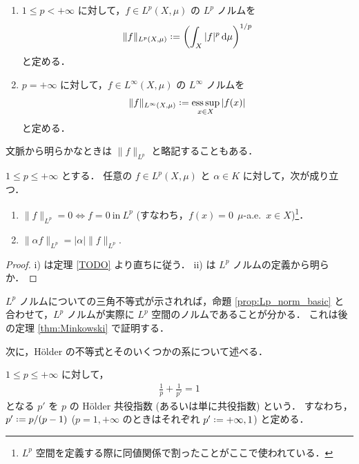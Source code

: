 \begin{definition}\label{def:Lp_norm}
    \leavevmode
    \begin{enumerate}
        \item
            $1\le p<+\infty$ に対して，$f\in L^p(X,\mu)$ の $L^p$ ノルムを
            \begin{align*}
                \|f\|_{L^p(X,\mu)}\defeq\left(\int_X|f|^p\,\drm\mu\right)^{1/p}
            \end{align*}
            と定める．
        \item
            $p=+\infty$ に対して，$f\in L^\infty(X,\mu)$ の $L^\infty$ ノルムを
            \begin{align*}
                \|f\|_{L^\infty(X,\mu)}\defeq\esssup_{x\in X}|f(x)|
            \end{align*}
            と定める．
    \end{enumerate}
    文脈から明らかなときは $\|f\|_{L^p}$ と略記することもある．
\end{definition}

\begin{proposition}\label{prop:Lp_norm_basic}
    $1\le p\le+\infty$ とする．
    任意の $f\in L^p(X,\mu)$ と $\alpha\in K$ に対して，次が成り立つ．
    \begin{enumerate}
        \item $\|f\|_{L^p}=0\iff f=0\ \text{in}\ L^p$ (すなわち，$f(x)=0\ \ \mu$-a.e.\ $x\in X$)\footnote{
            $L^p$ 空間を定義する際に同値関係で割ったことがここで使われている．
        }．
        \item $\|\alpha f\|_{L^p}=|\alpha|\|f\|_{L^p}.$
    \end{enumerate}
\end{proposition}

\begin{proof}
    \textrm{i)} は定理 \ref{TODO} より直ちに従う．
    \textrm{ii)} は $L^p$ ノルムの定義から明らか．
\end{proof}

$L^p$ ノルムについての三角不等式が示されれば，命題 \ref{prop:Lp_norm_basic} と合わせて，$L^p$ ノルムが実際に $L^p$ 空間のノルムであることが分かる．
これは後の定理 \ref{thm:Minkowski} で証明する．

次に，H\"older の不等式とそのいくつかの系について述べる．

\begin{definition}
    $1\le p\le+\infty$ に対して，
    \begin{align*}
        \frac{1}{p}+\frac{1}{p'}=1
    \end{align*}
    となる $p'$ を $p$ の H\"older 共役指数 (あるいは単に共役指数) という．
    すなわち，$p'\defeq p/(p-1)$ ($p=1,+\infty$ のときはそれぞれ $p'\defeq+\infty,1$) と定める．
\end{definition}


